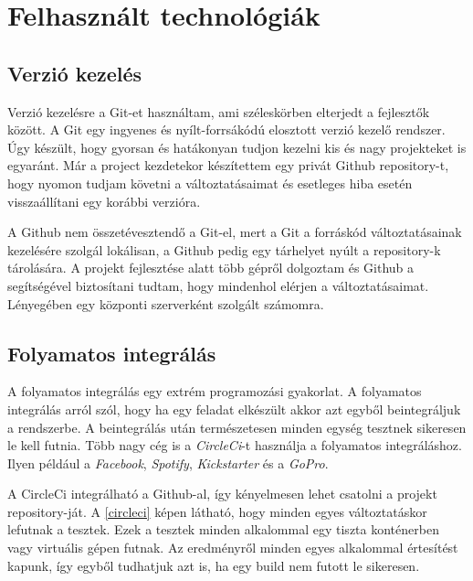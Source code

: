 \documentclass{thesis-ekf}
\theoremstyle{definition}
\theoremstyle{remark}
\begin{document}
\chapter{Felhasznált technológiák}\label{technologiak}

\section{Verzió kezelés}

Verzió kezelésre a Git-et használtam, ami széleskörben elterjedt a fejlesztők között.
A Git egy ingyenes és nyílt-forrsákódú elosztott verzió kezelő rendszer. Úgy készült, hogy gyorsan és hatákonyan tudjon kezelni kis és nagy projekteket is egyaránt.
Már a project kezdetekor készítettem egy privát Github repository-t, hogy nyomon tudjam követni a változtatásaimat és esetleges hiba esetén visszaállítani egy korábbi verzióra.


A Github nem összetévesztendő a Git-el, mert a Git a forráskód változtatásainak kezelésére szolgál lokálisan, a Github pedig egy tárhelyet nyúlt a repository-k tárolására.
A projekt fejlesztése alatt több gépről dolgoztam és Github a segítségével biztosítani tudtam, hogy mindenhol elérjen a változtatásaimat.
Lényegében egy központi szerverként szolgált számomra.


\section{Folyamatos integrálás}

A folyamatos integrálás egy extrém programozási gyakorlat.
A folyamatos integrálás arról szól, hogy ha egy feladat elkészült akkor azt egyből beintegráljuk a rendszerbe.
A beintegrálás után természetesen minden egység tesztnek sikeresen le kell futnia.
Több nagy cég is a \emph{CircleCi}-t használja a folyamatos integráláshoz.
Ilyen például a \emph{Facebook}, \emph{Spotify}, \emph{Kickstarter} és a \emph{GoPro}.


A CircleCi integrálható a Github-al, így kényelmesen lehet csatolni a projekt repository-ját.
A \ref{circleci} képen látható, hogy minden egyes változtatáskor lefutnak a tesztek.
Ezek a tesztek minden alkalommal egy tiszta konténerben vagy virtuális gépen futnak.
Az eredményről minden egyes alkalommal értesítést kapunk, így egyből tudhatjuk azt is, ha egy build nem futott le sikeresen.

\end{document}
